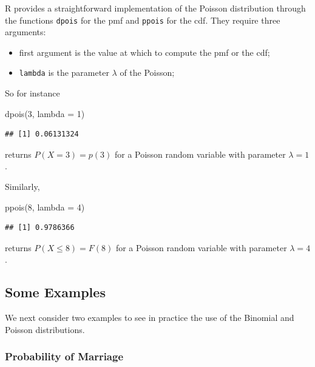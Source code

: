 \documentclass[
]{book}
\newenvironment{Shaded}{\begin{snugshade}}{\end{snugshade}}
\newcommand{\AttributeTok}[1]{\textcolor[rgb]{0.77,0.63,0.00}{#1}}
\newcommand{\DecValTok}[1]{\textcolor[rgb]{0.00,0.00,0.81}{#1}}
\newcommand{\FunctionTok}[1]{\textcolor[rgb]{0.00,0.00,0.00}{#1}}
\newcommand{\NormalTok}[1]{#1}
\begin{document}
R provides a straightforward implementation of the Poisson distribution through the functions \texttt{dpois} for the pmf and \texttt{ppois} for the cdf. They require three arguments:

\begin{itemize}
\item
  first argument is the value at which to compute the pmf or the cdf;
\item
  \texttt{lambda} is the parameter \(\lambda\) of the Poisson;
\end{itemize}

So for instance

\begin{Shaded}
\begin{Highlighting}[]
\FunctionTok{dpois}\NormalTok{(}\DecValTok{3}\NormalTok{, }\AttributeTok{lambda =} \DecValTok{1}\NormalTok{)}
\end{Highlighting}
\end{Shaded}

\begin{verbatim}
## [1] 0.06131324
\end{verbatim}

returns \(P(X=3)=p(3)\) for a Poisson random variable with parameter \(\lambda = 1\).

Similarly,

\begin{Shaded}
\begin{Highlighting}[]
\FunctionTok{ppois}\NormalTok{(}\DecValTok{8}\NormalTok{, }\AttributeTok{lambda =} \DecValTok{4}\NormalTok{)}
\end{Highlighting}
\end{Shaded}

\begin{verbatim}
## [1] 0.9786366
\end{verbatim}

returns \(P(X\leq 8) = F(8)\) for a Poisson random variable with parameter \(\lambda = 4\).

\hypertarget{some-examples}{%
\subsection{Some Examples}\label{some-examples}}

We next consider two examples to see in practice the use of the Binomial and Poisson distributions.

\hypertarget{probability-of-marriage}{%
\subsubsection{Probability of Marriage}\label{probability-of-marriage}}
\end{document}
